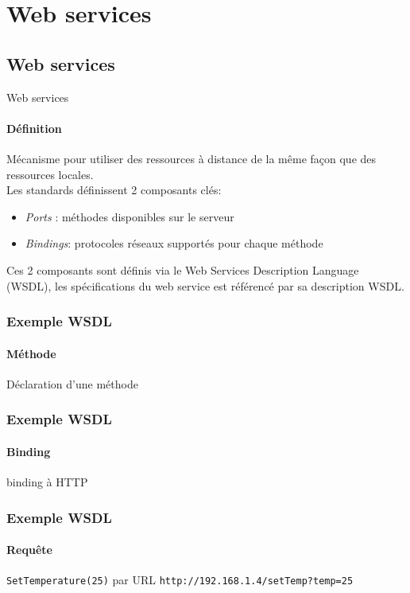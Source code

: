 \section{Web services}
\subsection{Web services}
\begin{frame}{Web services}
\framesubtitle{Définition}
Mécanisme pour utiliser des ressources à distance de la même façon que des ressources locales.\\
Les standards définissent 2 composants clés:
\begin{itemize}
\item \textit{Ports} : méthodes disponibles sur le serveur  
\item \textit{Bindings}: protocoles réseaux supportés pour chaque méthode
\end{itemize}
Ces 2 composants sont définis via le Web Services Description Language (WSDL), les spécifications du web service est référencé par sa description WSDL.
\end{frame}

\begin{frame}
\frametitle{Exemple WSDL}
\framesubtitle{Méthode}
\begin{exampleblock}{Déclaration d'une méthode}

\end{exampleblock}
\end{frame}

\begin{frame}
\frametitle{Exemple WSDL}
\framesubtitle{Binding}
\begin{exampleblock}{binding à HTTP}

\end{exampleblock}
\end{frame}

\begin{frame}
\frametitle{Exemple WSDL}
\framesubtitle{Requête}
\begin{exampleblock}{\texttt{SetTemperature(25)} par URL}
\texttt{http://192.168.1.4/setTemp?temp=25}
\end{exampleblock}
\end{frame}

